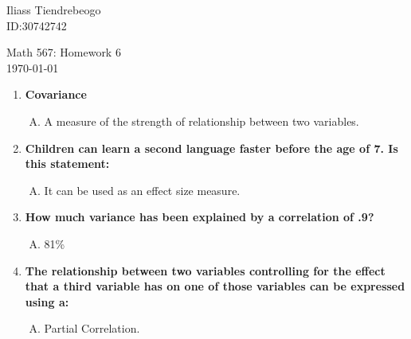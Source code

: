 \documentclass{article}[16pt]
\begin{document}
\hfill Iliass Tiendrebeogo\\

\hfill ID:30742742\\

\bigskip

\begin{center}
  \begin{Large}
    Math 567: Homework 6 \\
     {\small \today}
   
  \end{Large}
\end{center} 


\begin{enumerate}[1.]
\item  %
{\bf Covariance}
 \begin{enumerate}[B.]
 \item
A measure of the strength of relationship between two variables.
\end{enumerate}
\item %
{\bf Children can learn a second language faster before the age of 7. Is this statement:}
 \begin{enumerate}[A.]
 \item 
  It can be used as an effect size measure.
  \end{enumerate}

\item %
{\bf How much variance has been explained by a correlation of .9?}
 \begin{enumerate}[A.]
 \item 
81\%
  \end{enumerate}

\item %
{\bf The relationship between two variables controlling for the effect that a third variable has on one of those
variables can be expressed using a:}
 \begin{enumerate}[D.]
 \item 
Partial Correlation.
  \end{enumerate}
  
  

\end{enumerate}
\end{document}
